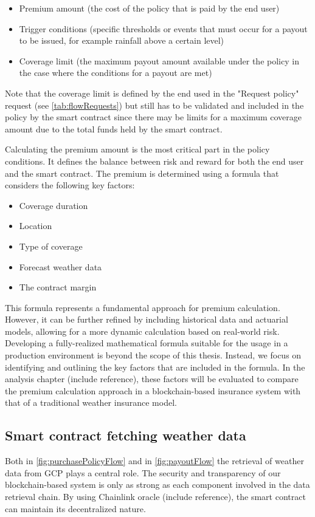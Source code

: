 \begin{itemize}
    \item Premium amount (the cost of the policy that is paid by the end user)
    \item Trigger conditions (specific thresholds or events that must occur for a payout to be issued, for example rainfall above a certain level)
    \item Coverage limit (the maximum payout amount available under the policy in the case where the conditions for a payout are met)
\end{itemize}

Note that the coverage limit is defined by the end used in the "Request policy" request (see \cref{tab:flowRequests}) but still has to be validated and included in the policy by the smart contract since there may be limits for a maximum coverage amount due to the total funds held by the smart contract.

Calculating the premium amount is the most critical part in the policy conditions. It defines the balance between risk and reward for both the end user and the smart contract. The premium is determined using a formula that considers the following key factors:

\begin{itemize}
    \item Coverage duration
    \item Location
    \item Type of coverage
    \item Forecast weather data
    \item The contract margin
\end{itemize}

This formula represents a fundamental approach for premium calculation. However, it can be further refined by including historical data and actuarial models, allowing for a more dynamic calculation based on real-world risk. Developing a fully-realized mathematical formula suitable for the usage in a production environment is beyond the scope of this thesis. Instead, we focus on identifying and outlining the key factors that are included in the formula. In the analysis chapter (include reference), these factors will be evaluated to compare the premium calculation approach in a blockchain-based insurance system with that of a traditional weather insurance model.

\subsection{Smart contract fetching weather data}

Both in \cref{fig:purchasePolicyFlow} and in \cref{fig:payoutFlow} the retrieval of weather data from GCP plays a central role. The security and transparency of our blockchain-based system is only as strong as each component involved in the data retrieval chain. By using Chainlink oracle (include reference), the smart contract can maintain its decentralized nature. 